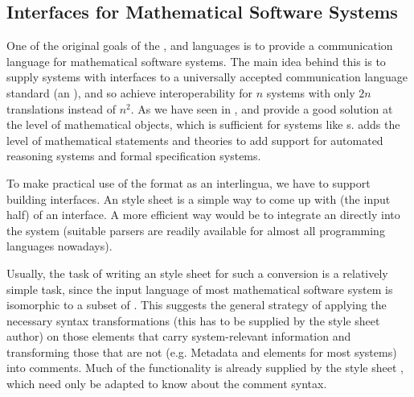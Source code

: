 \begin{omgroup}[id=transform-xsl,short=Transforming OMDoc]
\section[short=Interfaces for Systems]{{\omdoc} Interfaces for Mathematical Software Systems}\label{sec:omdoctosys}
  One of the original goals of the {\openmath}, {\cmathml} and {\omdoc} languages is to
  provide a communication language for mathematical software systems. The main idea behind
  this is to supply systems with interfaces to a universally accepted communication
  language standard (an {}), and so achieve interoperability for $n$
  systems with only $2n$ translations instead of $n^2$. As we have seen in
  {}, {\openmath} and {\cmathml} provide a good solution at the
  level of mathematical objects, which is sufficient for systems like {s}. {\omdoc} adds the level of mathematical statements and theories
  to add support for automated reasoning systems and formal specification systems.

To make practical use of the {\omdoc} format as an interlingua, we have to support
building {\omdoc} interfaces. An {\xslt} style sheet is a simple way to come up with (the
input half) of an {\omdoc} interface.  A more efficient way would be to integrate an
{\xml} directly into the system (suitable {\xml} parsers are readily
available for almost all programming languages nowadays).

Usually, the task of writing an {\xslt} style sheet for such a conversion is a
relatively simple task, since the input language of most mathematical software
system is isomorphic to a subset of {\omdoc}. This suggests the general strategy
of applying the necessary syntax transformations (this has to be supplied by the
style sheet author) on those {\omdoc} elements that carry system-relevant
information and transforming those that are not (e.g. Metadata and {}
elements for most systems) into comments.  Much of the functionality is already
supplied by the style sheet {}, which need only be adapted to
know about the comment syntax. 


\end{omgroup}
